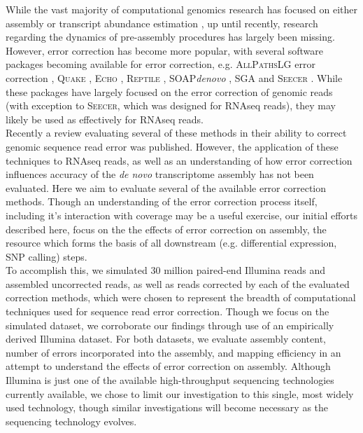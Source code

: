 \documentclass[11pt]{article}
\begin{document}
\noindent
While the vast majority of computational genomics research has focused on either assembly \citep{Chaisson:2004kf,Miller:2010gxa,Earl:2011gt,Bradnam:2013uu} or transcript abundance estimation \citep{Soneson:2013fr,Marioni:2008bg,Mortazavi:2008jj,Pyrkosz:2013tm}, up until recently, research regarding the dynamics of pre-assembly procedures has largely been missing. However, error correction has become more popular, with several software packages becoming available for error correction, e.g.  \textsc{AllPathsLG} error correction \citep{Gnerre:2011fd}, \textsc{Quake} \citep{Kelley:2010kg}, \textsc{Echo} \citep{Kao:2011bx}, \textsc{Reptile} \citep{Yang:2010kv}, SOAP\textit{denovo} \citep{Liu:2011ez}, \textsc{SGA} \citep{Simpson:2010fd} and \textsc{Seecer} \citep{Le:2013dy}.  While these packages have largely focused on the error correction of genomic reads (with exception to \textsc{Seecer}, which was designed for RNAseq reads), they may likely be used as effectively for RNAseq reads.  \\ 

\noindent
Recently a review \citep{Yang:2013ck} evaluating several of these methods in their ability to correct genomic sequence read error was published. However, the application of these techniques to RNAseq reads, as well as an understanding of how error correction influences accuracy of the \textit{de novo} transcriptome assembly has not been evaluated. Here we aim to evaluate several of the available error correction methods. Though an understanding of the error correction process itself, including it's interaction with coverage may be a useful exercise, our initial efforts described here, focus on the the effects of error correction on assembly, the resource which forms the basis of all downstream (e.g. differential expression, SNP calling) steps.  \\

\noindent
To accomplish this, we simulated 30 million paired-end Illumina reads and assembled uncorrected reads, as well as reads corrected by each of the evaluated correction methods, which were chosen to represent the breadth of computational techniques used for sequence read error correction.  Though we focus on the simulated dataset, we corroborate our findings through use of an empirically derived Illumina dataset.  For both datasets, we evaluate assembly content, number of errors incorporated into the assembly, and mapping efficiency in an attempt to understand the effects of error correction on assembly. Although Illumina is just one of the available high-throughput sequencing technologies currently available, we chose to limit our investigation to this single, most widely used technology, though similar investigations will become necessary as the sequencing technology evolves. \\
\end{document}
